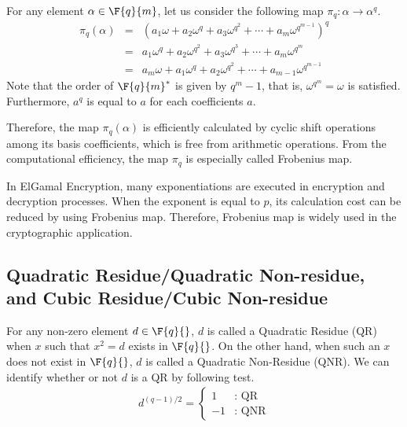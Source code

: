 For any element $\alpha \in \F{q}{m}$, let us consider the following map $\pi_q:\alpha \rightarrow \alpha^q$. 
\begin{eqnarray}
\pi_q(\alpha) &=& \left( a_1 \omega + a_2 \omega^q + a_3 \omega^{q^2} + \cdots + a_m \omega^{q^{m-1}} \right)^q \nonumber \\ 
             &=& a_1 \omega^q + a_2 \omega^{q^2} + a_3 \omega^{q^3} + \cdots + a_m \omega^{q^m} \nonumber \\
             &=& a_m \omega + a_1 \omega^q + a_2 \omega^{q^2} + \cdots + a_{m-1} \omega^{q^{m-1}}
\end{eqnarray}
Note that the order of $\F{q}{m}^*$ is given by $q^m - 1$, that is,  $\omega^{q^m} = \omega$ is satisfied.
Furthermore, $a^q$ is equal to $a$ for each coefficients $a$.

Therefore, the map $\pi_q(\alpha)$ is efficiently calculated by cyclic shift operations among its basis coefficients, 
which is free from arithmetic operations.
From the computational efficiency, the map $\pi_q$ is especially called Frobenius map.

In ElGamal Encryption, many exponentiations are executed in encryption and decryption processes.
When the exponent is equal to $p$, its calculation cost can be reduced by using Frobenius map.
Therefore, Frobenius map is widely used in the cryptographic application.     


\subsection{Quadratic Residue/Quadratic Non-residue, \\and Cubic Residue/Cubic Non-residue}

For any non-zero element $d\in\F{q}{}$, $d$ is called a Quadratic Residue (QR) when $x$ such that $x^2=d$ exists in $\F{q}{}$.
On the other hand, when such an $x$ does not exist in $\F{q}{}$, $d$ is called a Quadratic Non-Residue (QNR).
We can identify whether or not $d$ is a QR by following test.
\begin{eqnarray}
 d^{(q-1)/2} = \left\{
			   \begin{array}{ll}
                1 & \mbox{: QR} \\
               -1 & \mbox{: QNR} 
               \end{array}
			   \right.
\end{eqnarray}

